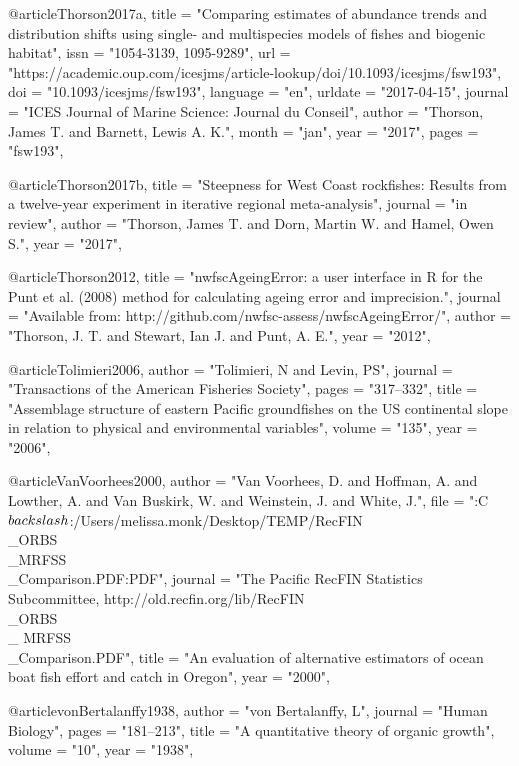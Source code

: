 @article{Thorson2017a,
    title = "{Comparing estimates of abundance trends and distribution shifts using single- and multispecies models of fishes and biogenic habitat}",
    issn = "{1054-3139, 1095-9289}",
    url = "{https://academic.oup.com/icesjms/article-lookup/doi/10.1093/icesjms/fsw193}",
    doi = "{10.1093/icesjms/fsw193}",
    language = "{en}",
    urldate = "{2017-04-15}",
    journal = "{ICES Journal of Marine Science: Journal du Conseil}",
    author = "{Thorson, James T. and Barnett, Lewis A. K.}",
    month = "jan",
    year = "{2017}",
    pages = "{fsw193}",
}

@article{Thorson2017b,
    title = "{Steepness for West Coast rockfishes:  Results from a twelve-year experiment in iterative regional meta-analysis}",
    journal = "{in review}",
    author = "{Thorson, James T. and Dorn, Martin W. and Hamel, Owen S.}",
    year = "{2017}",
}

@article{Thorson2012,
    title = "{{nwfscAgeingError}: a user interface in {R} for the {Punt} et al. (2008) method for calculating ageing error and imprecision.}",
    journal = "{Available from: http://github.com/nwfsc-assess/nwfscAgeingError/}",
    author = "{Thorson, J. T. and Stewart, Ian J. and Punt, A. E.}",
    year = "{2012}",
}

@article{Tolimieri2006,
    author = "{Tolimieri, N and Levin, PS}",
    journal = "{Transactions of the American Fisheries Society}",
    pages = "{317--332}",
    title = "{{Assemblage structure of eastern Pacific groundfishes on the US continental slope in relation to physical and environmental variables}}",
    volume = "{135}",
    year = "{2006}",
}

@article{VanVoorhees2000,
    author = "{{Van Voorhees}, D. and Hoffman, A. and Lowther, A. and {Van Buskirk}, W. and Weinstein, J. and White, J.}",
    file = "{:C$\\backslash$:/Users/melissa.monk/Desktop/TEMP/RecFIN\\_ORBS\\_MRFSS\\_Comparison.PDF:PDF}",
    journal = "{The Pacific RecFIN Statistics Subcommittee, http://old.recfin.org/lib/RecFIN\\_ORBS\\_ MRFSS\\_Comparison.PDF}",
    title = "{{An evaluation of alternative estimators of ocean boat fish effort and catch in Oregon}}",
    year = "{2000}",
}

@article{vonBertalanffy1938,
    author = "{von Bertalanffy, L}",
    journal = "{Human Biology}",
    pages = "{181--213}",
    title = "{{A quantitative theory of organic growth}}",
    volume = "{10}",
    year = "{1938}",
}

